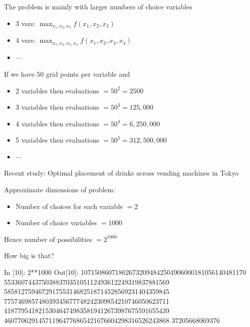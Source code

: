 \begin{frame}
    
    The problem is mainly with larger numbers of choice variables

    \begin{itemize}
        \item 3 vars: $\max_{x_1, x_2, x_3} f(x_1, x_2, x_3)$
        \item 4 vars: $\max_{x_1, x_2, x_3, x_4} f(x_1, x_2, x_3, x_4)$
        \item $\cdots$
    \end{itemize}

    If we have 50 grid points per variable and 
    
    \begin{itemize}
        \item 2 variables then evaluations $=50^2 = 2500$
        \item 3 variables then evaluations $=50^3 = 125,000$
        \item 4 variables then evaluations $=50^4 = 6,250,000$
        \item 5 variables then evaluations $=50^5 = 312,500,000$
        \item $\cdots$
    \end{itemize}

\end{frame}


\begin{frame}
    
    \Eg Recent study: Optimal placement of drinks across vending machines in
    Tokyo

    Approximate dimensions of problem:

    \begin{itemize}
        \item Number of choices for each variable $=2$
        \item Number of choice variables $=1000$
    \end{itemize}

    Hence number of possibilities $=2^{1000}$

    \vspace{1em}

    How big is that?

\end{frame}

\begin{frame}[fragile]
    
\begin{pythoncode}
In [10]: 2**1000
Out[10]:
107150860718626732094842504906000181056140481170
553360744375038837035105112493612249319837881569
585812759467291755314682518714528569231404359845
775746985748039345677748242309854210746050623711
418779541821530464749835819412673987675591655439
460770629145711964776865421676604298316526243868
37205668069376
\end{pythoncode}

\end{frame}


